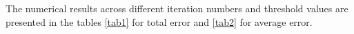 The numerical results across different iteration numbers and threshold values are presented in the tables \ref{tab1} for total error and \ref{tab2} for average error.



